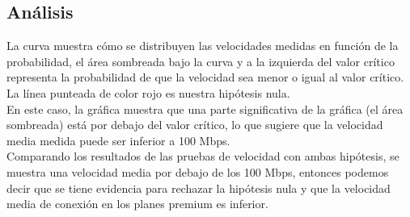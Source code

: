 \documentclass[letterpaper,12pt]{article}
\begin{document}
\begin{sloppypar}
\subsection*{Análisis}
La curva muestra cómo se distribuyen las velocidades medidas en función de la probabilidad, el área sombreada bajo la curva y a la izquierda del valor crítico representa la probabilidad de que la velocidad sea menor o igual al valor crítico. La línea punteada de color rojo es nuestra hipótesis nula.
\vspace{0.3cm}\\
En este caso, la gráfica muestra que una parte significativa de la gráfica (el área sombreada) está por debajo del valor crítico, lo que sugiere que la velocidad media medida puede ser inferior a 100 Mbps.
\vspace{0.3cm}\\
Comparando los resultados de las pruebas de velocidad con ambas hipótesis, se muestra una velocidad media por debajo de los 100 Mbps, entonces podemos decir que se tiene evidencia para rechazar la hipótesis nula y que la velocidad media de conexión en los planes premium es inferior.
\end{sloppypar}
\end{document}
